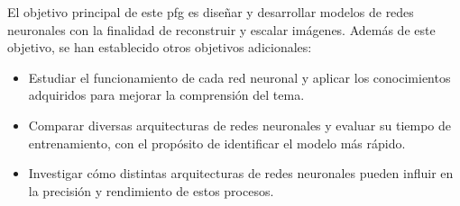 \quad El objetivo principal de este \gls{pfg} es diseñar y desarrollar modelos de redes neuronales con la finalidad de reconstruir y escalar imágenes. Además de este objetivo, se han establecido otros objetivos adicionales:

\begin{itemize}
	\item Estudiar el funcionamiento de cada red neuronal y aplicar los conocimientos adquiridos para mejorar la comprensión del tema.
	\item Comparar diversas arquitecturas de redes neuronales y evaluar su tiempo de entrenamiento, con el propósito de identificar el modelo más rápido.
	\item Investigar cómo distintas arquitecturas de redes neuronales pueden influir en la precisión y rendimiento de estos procesos.

\end{itemize}




